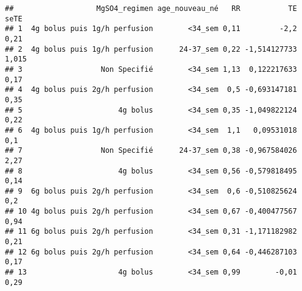 \documentclass[
]{article}
\newenvironment{Shaded}{\begin{snugshade}}{\end{snugshade}}
\newcommand{\FunctionTok}[1]{\textcolor[rgb]{0.13,0.29,0.53}{\textbf{#1}}}
\newcommand{\NormalTok}[1]{#1}
\newcommand{\OtherTok}[1]{\textcolor[rgb]{0.56,0.35,0.01}{#1}}
\newcommand{\SpecialCharTok}[1]{\textcolor[rgb]{0.81,0.36,0.00}{\textbf{#1}}}
\newcommand{\StringTok}[1]{\textcolor[rgb]{0.31,0.60,0.02}{#1}}
\begin{document}
\begin{verbatim}
##                   MgSO4_regimen age_nouveau_né   RR           TE  seTE
## 1  4g bolus puis 1g/h perfusion        <34_sem 0,11         -2,2  0,21
## 2  4g bolus puis 1g/h perfusion      24-37_sem 0,22 -1,514127733 1,015
## 3                  Non Specifié        <34_sem 1,13  0,122217633  0,17
## 4  4g bolus puis 2g/h perfusion        <34_sem  0,5 -0,693147181  0,35
## 5                      4g bolus        <34_sem 0,35 -1,049822124  0,22
## 6  4g bolus puis 1g/h perfusion        <34_sem  1,1   0,09531018   0,1
## 7                  Non Specifié      24-37_sem 0,38 -0,967584026  2,27
## 8                      4g bolus        <34_sem 0,56 -0,579818495  0,14
## 9  6g bolus puis 2g/h perfusion        <34_sem  0,6 -0,510825624   0,2
## 10 4g bolus puis 2g/h perfusion        <34_sem 0,67 -0,400477567  0,94
## 11 6g bolus puis 2g/h perfusion        <34_sem 0,31 -1,171182982  0,21
## 12 6g bolus puis 2g/h perfusion        <34_sem 0,64 -0,446287103  0,17
## 13                     4g bolus        <34_sem 0,99        -0,01  0,29
\end{verbatim}

\begin{Shaded}
\end{Shaded}
\end{document}
